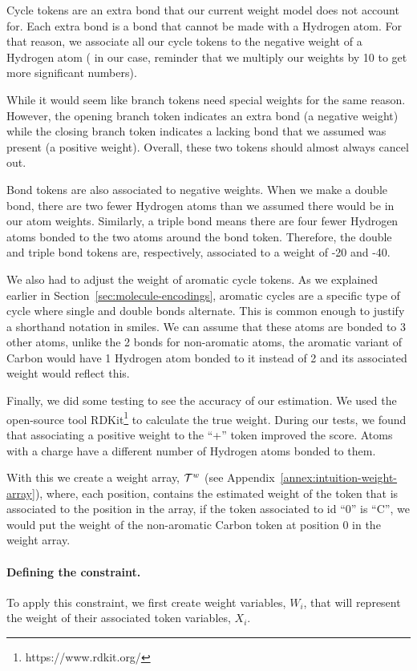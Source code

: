 \documentclass[../Document.tex]{subfiles}
\begin{document}
Cycle tokens are an extra bond that our current weight model does not account for.
Each extra bond is a bond that cannot be made with a Hydrogen atom.
For that reason, we associate all our cycle tokens to the negative weight of a Hydrogen atom ( in our case, reminder that we multiply our weights by 10 to get more significant numbers).

While it would seem like branch tokens need special weights for the same reason.
However, the opening branch token indicates an extra bond (\ie a negative weight) while the closing branch token indicates a lacking bond that we assumed was present (\ie a positive weight).
Overall, these two tokens should almost always cancel out.

Bond tokens are also associated to negative weights.
When we make a double bond, there are two fewer Hydrogen atoms than we assumed there would be in our atom weights.
Similarly, a triple bond means there are four fewer Hydrogen atoms bonded to the two atoms around the bond token.
Therefore, the double and triple bond tokens are, respectively, associated to a weight of -20 and -40.

We also had to adjust the weight of aromatic cycle tokens.
As we explained earlier in Section~\ref{sec:molecule-encodings}, aromatic cycles are a specific type of cycle where single and double bonds alternate.
This is common enough to justify a shorthand notation in \gls{smiles}.
We can assume that these atoms are bonded to 3 other atoms, unlike the 2 bonds for non-aromatic atoms, \eg the aromatic variant of Carbon would have 1 Hydrogen atom bonded to it instead of 2 and its associated weight would reflect this.

Finally, we did some testing to see the accuracy of our estimation.
We used the open-source tool RDKit\footnote{https://www.rdkit.org/} to calculate the true weight.
During our tests, we found that associating a positive weight to the ``+'' token improved the score.
Atoms with a charge have a different number of Hydrogen atoms bonded to them.

With this we create a weight array, ${\cal T}^w$ (see Appendix~\ref{annex:intuition-weight-array}),  where, each position, contains the estimated weight of the token that is associated to the position in the array, \eg if the token associated to id ``0'' is ``C'', we would put the weight of the non-aromatic Carbon token at position 0 in the weight array.

\paragraph{Defining the constraint.}
To apply this constraint, we first create weight variables, $W_i$, that will represent the weight of their associated token variables, $X_i$.
\end{document}
